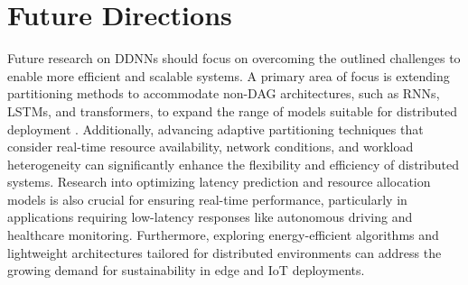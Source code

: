 \documentclass[conference]{IEEEtran}
\begin{document}
\section{Future Directions}

Future research on DDNNs should focus on overcoming the outlined challenges to enable more efficient and scalable systems. A primary area of focus is extending partitioning methods to accommodate non-DAG architectures, such as RNNs, LSTMs, and transformers, to expand the range of models suitable for distributed deployment \cite{zhang2021dynamic, zhao2018deepthings}. Additionally, advancing adaptive partitioning techniques that consider real-time resource availability, network conditions, and workload heterogeneity can significantly enhance the flexibility and efficiency of distributed systems. Research into optimizing latency prediction and resource allocation models is also crucial for ensuring real-time performance, particularly in applications requiring low-latency responses like autonomous driving and healthcare monitoring. Furthermore, exploring energy-efficient algorithms and lightweight architectures tailored for distributed environments can address the growing demand for sustainability in edge and IoT deployments.

\end{document}
